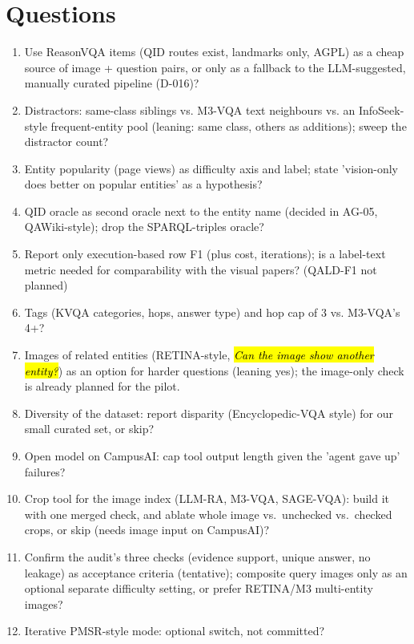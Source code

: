 \documentclass[10pt,a4paper]{article}
\newcommand{\q}[1]{\hl{\footnotesize\itshape #1}}
\begin{document}
\section{Questions}
\begin{enumerate}
  \item Use ReasonVQA items (QID routes exist, landmarks only, AGPL)
    as a cheap source of image + question pairs, or only as a fallback
    to the LLM-suggested, manually curated pipeline (D-016)?
  \item Distractors: same-class siblings vs. M3-VQA text neighbours
    vs. an InfoSeek-style frequent-entity pool (leaning: same class,
    others as additions); sweep the distractor count?
  \item Entity popularity (page views) as difficulty axis and label;
    state 'vision-only does better on popular entities' as a hypothesis?
  \item QID oracle as second oracle next to the entity name (decided in
    AG-05, QAWiki-style); drop the SPARQL-triples oracle?
  \item Report only execution-based row F1 (plus cost, iterations); is a
    label-text metric needed for comparability with the visual papers?
    (QALD-F1 not planned)
  \item Tags (KVQA categories, hops, answer type) and hop cap of 3
    vs. M3-VQA's 4+?
  \item Images of related entities (RETINA-style, \q{Can the image
    show another entity?}) as an option for harder questions (leaning
    yes); the image-only check is already planned for the pilot.
  \item Diversity of the dataset: report disparity (Encyclopedic-VQA
    style) for our small curated set, or skip?
  \item Open model on CampusAI: cap tool output length given the
    'agent gave up' failures?
  \item Crop tool for the image index (LLM-RA, M3-VQA, SAGE-VQA): build
    it with one merged check, and ablate whole image vs.\ unchecked
    vs.\ checked crops, or skip (needs image input on CampusAI)?
  \item Confirm the audit's three checks (evidence support, unique
    answer, no leakage) as acceptance criteria (tentative); composite
    query images only as an optional separate difficulty setting, or
    prefer RETINA/M3 multi-entity images?
  \item Iterative PMSR-style mode: optional switch, not committed?
\end{enumerate}

\printbibliography
\end{document}
